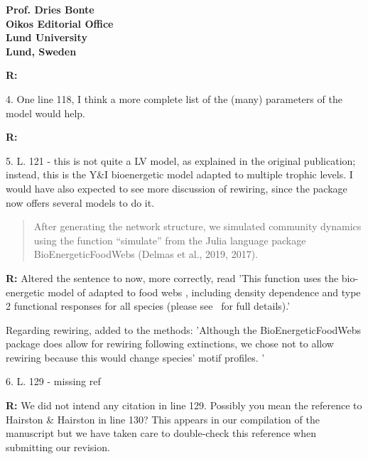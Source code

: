 \documentclass[12pt]{letter}
\begin{document}
\begin{letter}{\bf Prof. Dries Bonte\\
Oikos Editorial Office \\
Lund University \\
Lund, Sweden}
    \smallskip

    \textbf{R:} %

    \smallskip

    4. One line 118, I think a more complete list of the (many) parameters of the model would help.


    \smallskip

    \textbf{R:}

    \smallskip

    5. L. 121 - this is not quite a LV model, as explained in the original publication; instead, this is the Y\&I bioenergetic model adapted to multiple trophic levels. I would have also expected to see more discussion of rewiring, since the package now offers several models to do it.

    \begin{quotation}
    After generating the network structure, we simulated community dynamics using the function “simulate” from the Julia language package BioEnergeticFoodWebs (Delmas et al., 2019, 2017).
    \end{quotation}

    \smallskip

    \textbf{R:} Altered the sentence to now, more correctly, read 'This function uses the bio-energetic model of \citet{Yodzis1992} adapted to food webs \citep{Williams2007}, including density dependence and type 2 functional responses for all species (please see~\citet{Delmas2017} for full details).'
    
    Regarding rewiring, added to the methods: 'Although the BioEnergeticFoodWebs package does allow for rewiring following extinctions, we chose not to allow rewiring because this would change species' motif profiles. '

    \smallskip

    6. L. 129 - missing ref

    \smallskip

    \textbf{R:} We did not intend any citation in line 129. Possibly you mean the reference to Hairston \& Hairston in line 130? This appears in our compilation of the manuscript but we have taken care to double-check this reference when submitting our revision.%


\end{letter}
\end{document}

